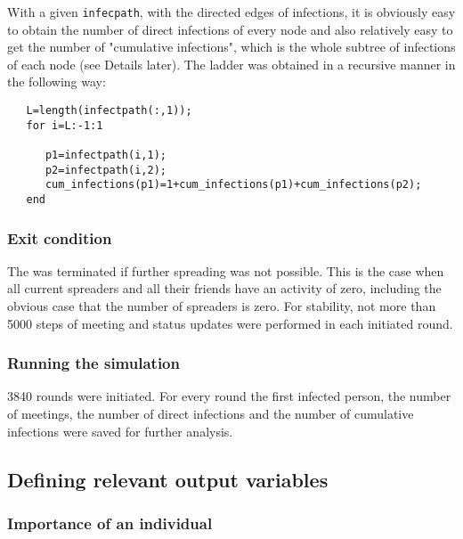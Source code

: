 With a given \texttt{infecpath}, with the directed edges of infections, it is obviously easy to obtain the number of direct infections of every node and also relatively easy to get the number of "cumulative infections", which is the whole subtree of infections of each node (see Details later). The ladder was obtained in a recursive manner in the following way:

\begin{lstlisting} 
   L=length(infectpath(:,1));
   for i=L:-1:1
      
      p1=infectpath(i,1);
      p2=infectpath(i,2);
      cum_infections(p1)=1+cum_infections(p1)+cum_infections(p2);
   end

\end{lstlisting}


\subsubsection{Exit condition}

The  was terminated if further spreading was not possible. This is the case when all current spreaders and all their friends have an activity of zero, including the obvious case that the number of spreaders is zero. For stability, not more than 5000 steps of meeting and status updates were performed in each initiated round.

\subsubsection{Running the simulation}
3840 rounds were initiated. For every round the first infected person, the number of meetings, the number of direct infections and the number of cumulative infections were saved for further analysis.

\subsection{Defining relevant output variables}

\subsubsection{Importance of an individual}

